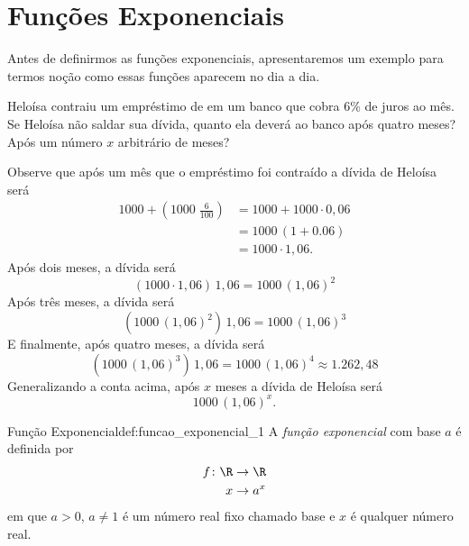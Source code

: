 \section{Funções Exponenciais}

Antes de definirmos as funções exponenciais, apresentaremos um exemplo para
termos noção como essas funções aparecem no dia a dia.

\begin{example}
  \label{ex:funcao_exp_1}
  Heloísa contraiu um empréstimo de  em um banco que cobra 6\%
  de juros ao mês. Se Heloísa não saldar sua dívida, quanto ela deverá ao banco
  após quatro meses? Após um número $x$ arbitrário de meses?

  \solution
  Observe que após um mês que o empréstimo foi contraído a dívida de Heloísa
  será
  \begin{align*}
    1000 + \left(1000 \; \frac{6}{100}\right)
    & = 1000+1000\cdot 0,06  \\
    & = 1000 \, (1+0.06)    \\
    & = 1000\cdot 1,06.
  \end{align*}
  Após dois meses, a dívida será
  \[
    (1000 \cdot 1,06) \, 1,06
    = 1000 \, (1,06)^2
  \]
  Após três meses, a dívida será
  \[
    \left(1000 \, (1,06)^2\right) \, 1,06
    = 1000 \, (1,06)^3
  \]
  E finalmente, após quatro meses, a dívida será
  \[
    \left(1000 \, (1,06)^3\right) \, 1,06
    = 1000 \, (1,06)^4
    \approx 1.262,48
  \]
  Generalizando a conta acima, após $x$ meses a dívida de Heloísa será
  \[
    1000 \, (1,06)^x.
  \]
\end{example}

\begin{definicao}{Função Exponencial}{def:funcao_exponencial_1}
  A \emph{função exponencial}
  com base $a$ é definida por
  \begin{align*}
    f\colon \R & \to \R \\
            x  & \to a^x
  \end{align*}
  em que $a>0$, $a\neq 1$ é um número real fixo chamado base e
  $x$ é qualquer número real.
\end{definicao}

